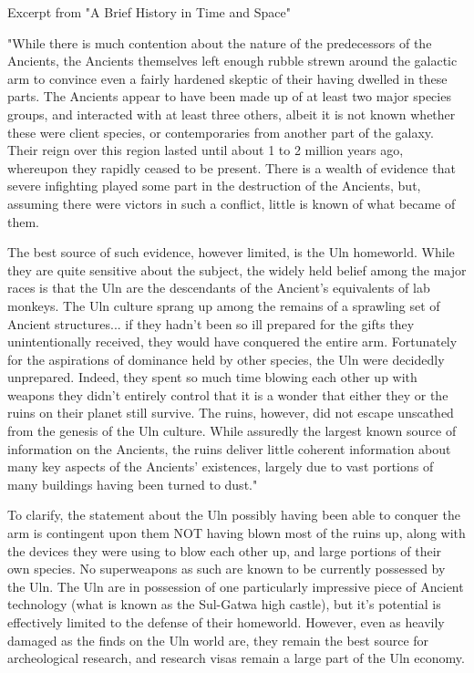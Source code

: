 Excerpt from "A Brief History in Time and Space" 

"While there is much contention about the nature of the predecessors
of the Ancients, the Ancients themselves left enough rubble strewn
around the galactic arm to convince even a fairly hardened skeptic of
their having dwelled in these parts. The Ancients appear to have been
made up of at least two major species groups, and interacted with at
least three others, albeit it is not known whether these were client
species, or contemporaries from another part of the galaxy. Their
reign over this region lasted until about 1 to 2 million years ago,
whereupon they rapidly ceased to be present. There is a wealth of
evidence that severe infighting played some part in the destruction of
the Ancients, but, assuming there were victors in such a conflict,
little is known of what became of them.

The best source of such evidence, however limited, is the Uln
homeworld. While they are quite sensitive about the subject, the
widely held belief among the major races is that the Uln are the
descendants of the Ancient's equivalents of lab monkeys. The Uln
culture sprang up among the remains of a sprawling set of Ancient
structures... if they hadn't been so ill prepared for the gifts they
unintentionally received, they would have conquered the entire
arm. Fortunately for the aspirations of dominance held by other
species, the Uln were decidedly unprepared. Indeed, they spent so much
time blowing each other up with weapons they didn't entirely control
that it is a wonder that either they or the ruins on their planet
still survive.  The ruins, however, did not escape unscathed from the
genesis of the Uln culture. While assuredly the largest known source
of information on the Ancients, the ruins deliver little coherent
information about many key aspects of the Ancients' existences,
largely due to vast portions of many buildings having been turned to
dust."

To clarify, the statement about the Uln possibly having been able to
conquer the arm is contingent upon them NOT having blown most of the
ruins up, along with the devices they were using to blow each other
up, and large portions of their own species. No superweapons as such
are known to be currently possessed by the Uln. The Uln are in
possession of one particularly impressive piece of Ancient technology
(what is known as the Sul-Gatwa high castle), but it's potential is
effectively limited to the defense of their homeworld. However, even
as heavily damaged as the finds on the Uln world are, they remain the
best source for archeological research, and research visas remain a
large part of the Uln economy.

